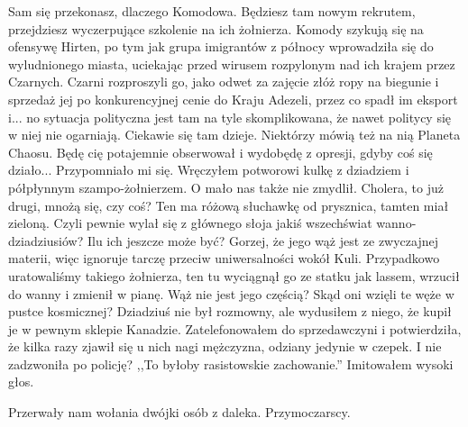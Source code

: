 \begin{dialogue}
\ds{} Sam się przekonasz, dlaczego Komodowa. Będziesz tam nowym rekrutem, przejdziesz wyczerpujące szkolenie na ich żołnierza. 
Komody szykują się na ofensywę Hirten, po tym jak grupa imigrantów z północy wprowadziła się do wyludnionego miasta, uciekając przed wirusem rozpylonym nad ich krajem przez Czarnych.
Czarni rozproszyli go, jako odwet za zajęcie złóż ropy na biegunie i sprzedaż jej po konkurencyjnej cenie do Kraju Adezeli, przez co spadł im eksport i... 
no sytuacja polityczna jest tam na tyle skomplikowana, że nawet politycy się w niej nie ogarniają.
\ds{} Ciekawie się tam dzieje.
\ds{} Niektórzy mówią też na nią Planeta Chaosu. Będę cię potajemnie obserwował i wydobędę z opresji, gdyby coś się działo...
\ds{} Przypomniało mi się. \dm{} Wręczyłem potworowi kulkę z dziadziem i półpłynnym szampo-żołnierzem. \dm{} O mało nas także nie zmydlił.
\ds{} Cholera, to już drugi, mnożą się, czy coś?
\ds{} Ten ma różową słuchawkę od prysznica, tamten miał zieloną. 
\ds{} Czyli pewnie wylał się z głównego słoja jakiś wszechświat wanno-dziadziusiów? Ilu ich jeszcze może być?
\ds{} Gorzej, że jego wąż jest ze zwyczajnej materii, więc ignoruje tarczę przeciw uniwersalności wokół Kuli.
Przypadkowo uratowaliśmy takiego żołnierza, ten tu wyciągnął go ze statku jak lassem, wrzucił do wanny i zmienił w pianę.
\ds{} Wąż nie jest jego częścią? Skąd oni wzięli te węże w pustce kosmicznej?
\ds{} Dziadziuś nie był rozmowny, ale wydusiłem z niego, że kupił je w pewnym sklepie Kanadzie. 
Zatelefonowałem do sprzedawczyni i potwierdziła, że kilka razy zjawił się u nich nagi mężczyzna, odziany jedynie w czepek.
\ds{} I nie zadzwoniła po policję?
\ds{} ,,To byłoby rasistowskie zachowanie.'' \dm{} Imitowałem wysoki głos.

\divider{} \divider{} \divider{} 

\end{dialogue}
Przerwały nam wołania dwójki osób z daleka. Przymoczarscy. 
